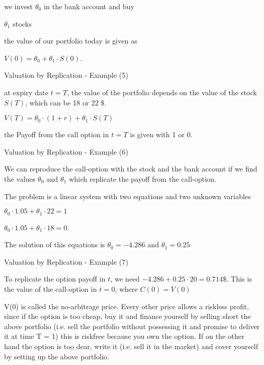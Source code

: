 



	we invest $\theta_0$ in the bank account and buy


	$\theta_1$ stocks


	the value of our portfolio today is given as


	$V(0) = \theta_0 + \theta_1 \cdot S(0)$.





{Valuation by Replication - Example (5)}






	at expiry date $t=T$, the value of the portfolio depends on the value of the stock $S(T)$, which can be 18 or 22 $\$$.


	$V(T) = \theta_0 \cdot (1+r) + \theta_1 \cdot S(T)$


	the Payoff from the call option in $t=T$ is given with 1 or 0.

{Valuation by Replication - Example (6)}






	We can reproduce the call-option with the stock and the bank account if we find the values $\theta_0$ and $\theta_1$ which replicate the payoff from the call-option.


	The problem is a linear system with two equations and two unknown variables


	$\theta_0 \cdot 1.05 + \theta_1 \cdot 22 = 1$


	$\theta_0 \cdot 1.05 + \theta_1 \cdot 18 = 0$.


	The solution of this equations is $\theta_0 = -4.286$ and $\theta_1 = 0.25$






{Valuation by Replication - Example (7)}






	To replicate the option payoff in $t$, we need $-4.286+0.25 \cdot 20 = 0.714 \$$. This is the value of the call-option in $t=0$, where $C(0)=V(0)$


	V(0) is called the no-arbitrage price. Every other price allows a
riskless profit, since if the option is too cheap, buy it and
finance yourself by selling short the above portfolio (i.e. sell the
portfolio without possessing it and promise to deliver it at time
T = 1) this is riskfree because you own the option. If on the
other hand the option is too dear, write it (i.e. sell it in the
market) and cover yourself by setting up the above portfolio.


